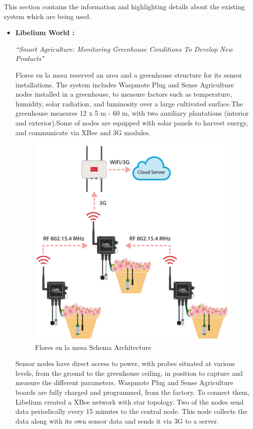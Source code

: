\documentclass[10pt,a4paper]{article}
\begin{document}
\quad
This section contains the information and highlighting details about the existing system which are being used.
\begin{itemize}
\item \textbf{Libelium World :} 

\textit{``Smart Agriculture: Monitoring Greenhouse Conditions To Develop New Products"}


\quad
Flores en la mesa reserved an area and a greenhouse structure for its sensor installations. The system includes Waspmote Plug and Sense Agriculture nodes installed in a greenhouse, to measure factors such as temperature, humidity, solar radiation, and luminosity over a large cultivated surface.The greenhouse measures 12 x 5 m - 60 m, with two auxiliary plantations (interior and exterior).Some of nodes are equipped with solar panels to harvest energy, and communicate via XBee and 3G modules.

\begin{figure}[hbtp]
\centering
\includegraphics[scale=0.4]{FM_diagram.jpg}
\caption{Flores en la mesa Schema Architecture}
\end{figure}

\quad
Sensor nodes have direct access to power, with probes situated at various levels, from the ground to the greenhouse ceiling, in position to capture and measure the different parameters. Waspmote Plug and Sense Agriculture boards are fully charged and programmed, from the factory. To connect them, Libelium created a XBee network with star topology. Two of the nodes send data periodically every 15 minutes to the central node. This node collects the data along with its own sensor data and sends it via 3G to a server.





\end{itemize}
\end{document}

